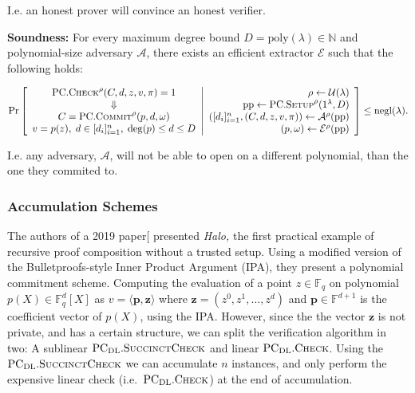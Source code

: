 \documentclass[
]{article}
\newcommand*\Fb{\mathbb{F}}
\newcommand*\Nb{\mathbb{N}}
\newcommand*\Ac{\mathcal{A}}
\newcommand*\Ec{\mathcal{E}}
\newcommand*\Uc{\mathcal{U}}
\renewcommand*\l{\lambda}
\renewcommand*\o{\omega}
\renewcommand{\vec}[1]{ \boldsymbol{#1} }
\newcommand{\ip}[2]{ \langle #1, #2 \rangle }
\newcommand*{\negl}{\text{negl}}
\newcommand*{\poly}{\text{poly}}
\newcommand*{\pp}{\mathrm{pp}}
\newcommand*{\Setup}{\mathrm{\text{S{\scriptsize ETUP}}}}
\newcommand*{\Commit}{\mathrm{\text{C{\scriptsize OMMIT}}}}
\newcommand*{\PC}{\text{PC}}
\newcommand*{\PCSetup}{\PC.\Setup}
\newcommand*{\PCCommit}{\PC.\Commit}
\newcommand*{\PCCheck}{\PC.\mathrm{\text{C\scriptsize HECK}}}
\newcommand*{\PCDL}{\text{PC}_{\text{DL}}}
\newcommand*{\PCDLSuccinctCheck}{\PCDL.\mathrm{\text{S{\scriptsize UCCINCT}C{\scriptsize HECK}}}}
\newcommand*{\PCDLCheck}{\PCDL.\mathrm{\text{C\scriptsize HECK}}}
\begin{document}
I.e. an honest prover will convince an honest verifier.

\textbf{Soundness:} For every maximum degree bound
\(D = \poly(\l) \in \Nb\) and polynomial-size adversary \(\Ac\), there
exists an efficient extractor \(\Ec\) such that the following holds:

\[
\Pr \left[
  \begin{array}{c}
    \PCCheck^\rho(C, d, z, v, \pi) = 1 \\
    \Downarrow \\
    C = \PCCommit^\rho(p, d, \o) \\
    v = p(z), \; d \in [d_i]^n_{i=1}, \; \deg(p) \leq d \leq D
  \end{array}
  \middle|
  \begin{array}{r}
    \rho \leftarrow \Uc(\l) \\
    \pp \leftarrow \PCSetup^\rho(1^\l, D) \\
    ([d_i]^n_{i=1}, (C, d, z, v, \pi)) \leftarrow \Ac^\rho(\pp) \\
    (p, \o) \leftarrow \Ec^\rho(\pp) \\
  \end{array}
\right] \leq \negl(\lambda).
\]

I.e. any adversary, \(\Ac\), will not be able to open on a different
polynomial, than the one they commited to.

\subsubsection{Accumulation Schemes}\label{accumulation-schemes}

The authors of a 2019 paper{[}\citeproc{ref-halo}{Bowe et al. 2019}{]}
presented \emph{Halo,} the first practical example of recursive proof
composition without a trusted setup. Using a modified version of the
Bulletproofs-style Inner Product Argument (IPA), they present a
polynomial commitment scheme. Computing the evaluation of a point \(z
\in \Fb_q\) on polynomial \(p(X) \in \Fb^d_q[X]\) as
\(v = \ip{\vec{p}}{\vec{z}}\) where
\(\vec{z} = (z^0, z^1, \dots, z^{d})\) and \(\vec{p} \in \Fb^{d+1}\) is
the coefficient vector of \(p(X)\), using the IPA. However, since the
the vector \(\vec{z}\) is not private, and has a certain structure, we
can split the verification algorithm in two: A sublinear
\(\PCDLSuccinctCheck\) and linear \(\PCDLCheck\). Using the
\(\PCDLSuccinctCheck\) we can accumulate \(n\) instances, and only
perform the expensive linear check (i.e.~\(\PCDLCheck\)) at the end of
accumulation.
\end{document}
